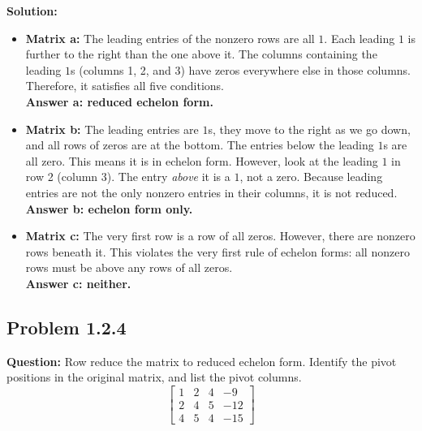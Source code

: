 \documentclass[11pt]{article}
\begin{document}
\textbf{Solution:}
\begin{itemize}
    \item \textbf{Matrix a:} The leading entries of the nonzero rows are all $1$. Each leading $1$ is further to the right than the one above it. The columns containing the leading $1$s (columns 1, 2, and 3) have zeros everywhere else in those columns. Therefore, it satisfies all five conditions. \\
    \textbf{Answer a: reduced echelon form.}
    
    \item \textbf{Matrix b:} The leading entries are $1$s, they move to the right as we go down, and all rows of zeros are at the bottom. The entries below the leading $1$s are all zero. This means it is in echelon form. However, look at the leading $1$ in row 2 (column 3). The entry \textit{above} it is a $1$, not a zero. Because leading entries are not the only nonzero entries in their columns, it is not reduced.\\
    \textbf{Answer b: echelon form only.}
    
    \item \textbf{Matrix c:} The very first row is a row of all zeros. However, there are nonzero rows beneath it. This violates the very first rule of echelon forms: all nonzero rows must be above any rows of all zeros.\\
    \textbf{Answer c: neither.}
\end{itemize}


\subsection*{Problem 1.2.4}
\textbf{Question:} Row reduce the matrix to reduced echelon form. Identify the pivot positions in the original matrix, and list the pivot columns.
\[ \begin{bmatrix} 1 & 2 & 4 & -9 \\ 2 & 4 & 5 & -12 \\ 4 & 5 & 4 & -15 \end{bmatrix} \]
\end{document}
